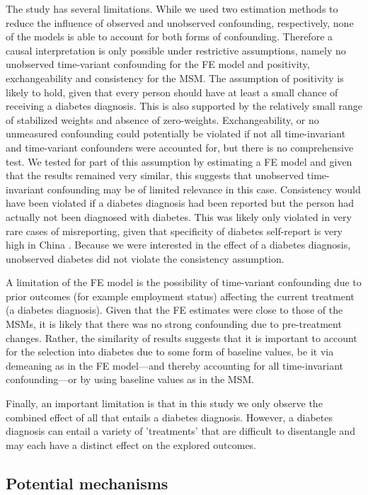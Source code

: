 The study has several limitations. While we used two estimation methods to reduce the influence of observed and unobserved confounding, respectively, none of the models is able to account for both forms of confounding. Therefore a causal interpretation is only possible under restrictive assumptions, namely no unobserved time-variant confounding for the \ac{FE} model and positivity, exchangeability and consistency for the \ac{MSM}. The assumption of positivity is likely to hold, given that every person should have at least a small chance of receiving a diabetes diagnosis. This is also supported by the relatively small range of stabilized weights and absence of zero-weights. Exchangeability, or no unmeasured confounding could potentially be violated if not all time-invariant and time-variant confounders were accounted for, but there is no comprehensive test. We tested for part of this assumption by estimating a \ac{FE} model and given that the results remained very similar, this suggests that unobserved time-invariant confounding may be of limited relevance in this case. Consistency would have been violated if a diabetes diagnosis had been reported but the person had actually not been diagnosed with diabetes. This was likely only violated in very rare cases of misreporting, given that specificity of diabetes self-report is very high in China \autocite{Yuan2015}. Because we were interested in the effect of a diabetes diagnosis, unobserved diabetes did not violate the consistency assumption.

A limitation of the \ac{FE} model is the possibility of time-variant confounding due to prior outcomes (for example employment status) affecting the current treatment (a diabetes diagnosis). Given that the \ac{FE} estimates were close to those of the \acp{MSM}, it is likely that there was no strong confounding due to pre-treatment changes. Rather, the similarity of results suggests that it is important to account for the selection into diabetes due to some form of baseline values, be it via demeaning as in the \ac{FE} model---and thereby accounting for all time-invariant confounding---or by using baseline values as in the \ac{MSM}.

Finally, an important limitation is that in this study we only observe the combined effect of all that entails a diabetes diagnosis.  However, a diabetes diagnosis can entail a variety of 'treatments' that are difficult to disentangle and may each have a distinct effect on the explored outcomes. 

\subsection{Potential mechanisms}

